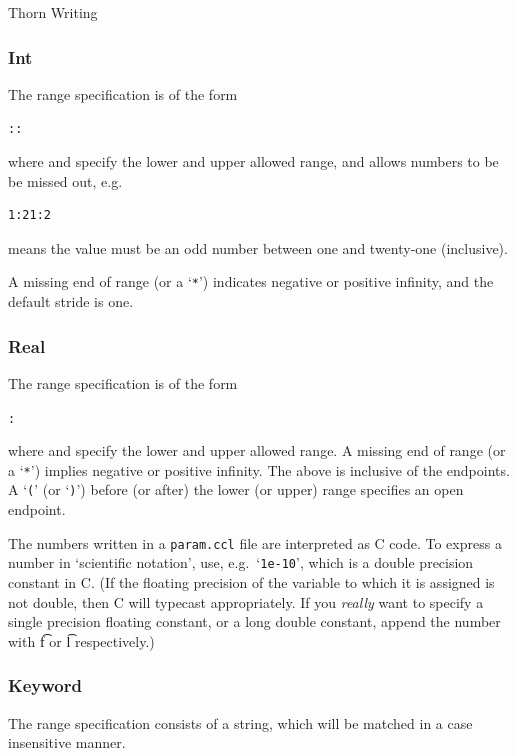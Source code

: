 \begin{cactuspart}{Thorn Writing}
\subsubsection{Int}

The range specification is of the form

\begin{alltt}
::
\end{alltt}

where  and  specify the lower and upper allowed
range, and  allows numbers to be be missed out, e.g.\
\begin{verbatim}
1:21:2
\end{verbatim}
means the value must be an odd number between one and twenty-one
(inclusive).

A missing end of range (or a `\texttt{*}') indicates negative or positive
infinity, and the default stride is one.

\subsubsection{Real}

The range specification is of the form
\begin{alltt}
:
\end{alltt}
where  and  specify the lower and upper allowed
range.  A missing end of range (or a `\texttt{*}') implies negative or positive
infinity.  The above is inclusive of the endpoints.  A `\texttt{(}'
(or `\texttt{)}') before (or after) the lower (or upper) range specifies an open
endpoint.

The numbers written in a \texttt{param.ccl} file are interpreted as C code.
To express a number in `scientific notation', use,
e.g.\ `\texttt{1e-10}', which is a double precision constant in C.  (If the
floating precision of the variable to which it is assigned is not
double, then C will typecast appropriately.  If you \emph{really} want to
specify a single precision floating constant, or a long double
constant, append the number with {\t f} or {\t l} respectively.)

\subsubsection{Keyword}

The range specification consists of a string, which will be matched in
a case insensitive manner.


\end{cactuspart}
